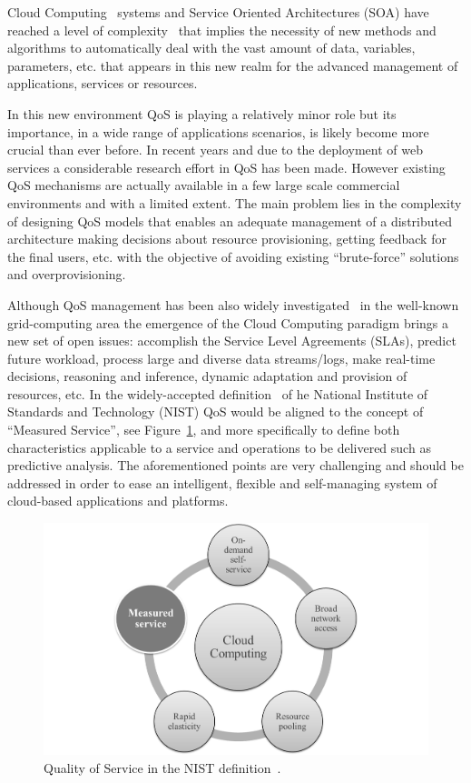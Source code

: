 Cloud Computing~\cite{mell2011nist} systems and Service Oriented Architectures (SOA) have 
reached a level of complexity~\cite{Huebscher:2008:SAC:1380584.1380585,Conejero:2012:MSQ:2357487.2357591} that implies the necessity of new methods 
and algorithms to automatically deal with the vast amount of data, variables, 
parameters, etc. that appears in this new realm for the advanced management of 
applications, services or resources. 

In this new environment QoS is playing a relatively minor role but its 
importance, in a wide range of applications scenarios, is likely become more 
crucial than ever before. In recent years and due to the deployment of web 
services a considerable research effort in QoS has been made. However existing 
QoS mechanisms are actually available in a few large scale commercial 
environments and with a limited extent. The main problem lies in the complexity 
of designing QoS models that enables an adequate management of a distributed 
architecture making decisions about resource provisioning, getting feedback for 
the final users, etc. with the objective of avoiding existing ``brute-force''
solutions and overprovisioning. 

Although QoS management has been also widely investigated~\cite{Conejero:2012:MSQ:2357487.2357591} 
in the well-known grid-computing area the emergence of the Cloud Computing paradigm 
brings a new set of open issues: accomplish the  Service Level Agreements (SLAs), predict 
future workload, process large and diverse data streams/logs, make real-time 
decisions, reasoning and inference, dynamic adaptation and provision of 
resources, etc. In the widely-accepted definition~\cite{mell2011nist} of 
he National Institute of Standards and Technology (NIST) QoS 
would be aligned to the concept of ``Measured Service'', see Figure~\ref{fig:qos-intro}, and more specifically to define both characteristics applicable to a service and operations 
to be delivered such as predictive analysis. The aforementioned points are very challenging and should be 
addressed in order to ease an intelligent, flexible and self-managing system of cloud-based applications and platforms.

% 
 \begin{figure}[!ht]
\centering
	\includegraphics[width=12cm]{./imgs/qos-intro}
 \caption{Quality of Service in the NIST definition~\cite{mell2011nist}.}
 \label{fig:qos-intro}
\end{figure}

